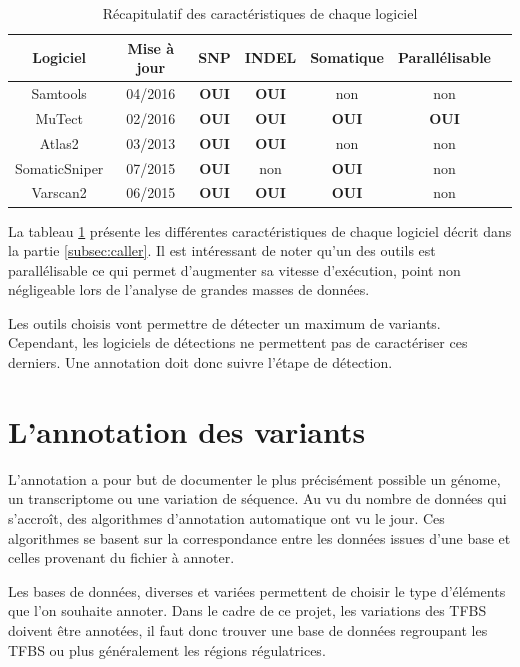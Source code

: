 \begin{table}[h]
\centering
\begin{tabular}{|c|c|c|c|c|c|c|}
\hline
Logiciel & Mise à jour & SNP & INDEL & Somatique & Parallélisable \\
\hline
Samtools & 04/2016 & \textbf{OUI} & \textbf{OUI} & non  & non\\
\hline
MuTect & 02/2016 & \textbf{OUI} & \textbf{OUI} & \textbf{OUI} & \textbf{OUI}\\
\hline
Atlas2 & 03/2013 & \textbf{OUI} & \textbf{OUI} & non & non\\
\hline
SomaticSniper & 07/2015 & \textbf{OUI} & non & \textbf{OUI} & non\\
\hline
Varscan2 & 06/2015 & \textbf{OUI} & \textbf{OUI} & \textbf{OUI} & non\\
\hline
\end{tabular}
\caption{Récapitulatif des caractéristiques de chaque logiciel}
\label{caract}
\end{table}

La tableau \ref{caract} présente les différentes caractéristiques de chaque logiciel décrit dans la partie \ref{subsec:caller}. Il est intéressant de noter qu'un des outils est parallélisable ce qui permet d'augmenter sa vitesse d'exécution, point non négligeable lors de l'analyse de grandes masses de données.

Les outils choisis vont permettre de détecter un maximum de variants. Cependant, les logiciels de détections ne permettent pas de caractériser ces derniers. Une annotation doit donc suivre l'étape de détection.

\section{L'annotation des variants}\label{annotation}

L'annotation a pour but de documenter le plus précisément possible un génome, un transcriptome ou une variation de séquence. Au vu du nombre de données qui s'accroît, des algorithmes d'annotation automatique ont vu le jour. Ces algorithmes se basent sur la correspondance entre les données issues d'une base et celles provenant du fichier à annoter.

Les bases de données, diverses et variées permettent de choisir le type d'éléments que l'on souhaite annoter. Dans le cadre de ce projet, les variations des TFBS doivent être annotées, il faut donc trouver une base de données regroupant les TFBS ou plus généralement les régions régulatrices.

